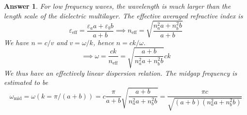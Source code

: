 \documentclass[a4paper]{article}
\newtheorem{ans}{Answer}
\theoremstyle{new}
\begin{document}
\begin{ans}
For low frequency waves, the wavelength is much larger than the length scale of the dielectric multilayer. The effective averaged refractive index is
$$\varepsilon_{\text{eff}}=\frac{\varepsilon_aa+\varepsilon_bb}{a+b}\implies n_{\text{eff}}=\sqrt{\frac{n_a^2a+n_b^2b}{a+b}}$$
We have $n=c/v$ and $v=\omega/k$, hence $n=ck/\omega$.
$$\implies\omega=\frac{ck}{n_{\text{eff}}}=\sqrt{\frac{a+b}{n_a^2a+n_b^2b}}ck$$
We thus have an effectively linear dispersion relation. The midgap frequency is estimated to be
$$\omega_{\text{mid}}=\omega(k=\pi/(a+b))=c\frac{\pi}{a+b}\sqrt{\frac{a+b}{n_a^2a+n_b^2b}}=\frac{\pi c}{\sqrt{(a+b)(n_a^2a+n_b^2b)}}$$
\begin{center}
\end{center}
\end{ans}
\newpage
\end{document}
